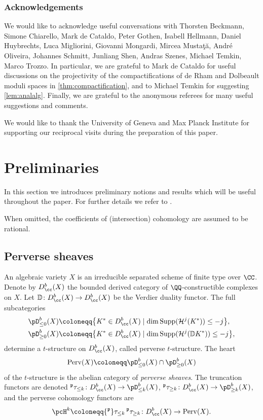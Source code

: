 \subsubsection*{Acknowledgements}
We would like to acknowledge useful conversations with Thorsten Beckmann, Simone Chiarello, Mark de Cataldo, Peter Gothen, Isabell Hellmann, Daniel Huybrechts, Luca Migliorini, Giovanni Mongardi, Mircea Mustaţă, André Oliveira, Johannes Schmitt, Junliang Shen, Andras Szenes, Michael Temkin, Marco Trozzo. In particular, we are grateful to Mark de Cataldo for useful discussions on the projectivity of the compactifications of de Rham and Dolbeault moduli spaces in \cref{thm:compactification}, and to Michael Temkin for suggesting \cref{lem:analalg}.
Finally, we are grateful to the anonymous referees for many useful suggestions and comments.

We would like to thank the University of Geneva and Max Planck Institute for supporting our reciprocal visits during the preparation of this paper.


\section{Preliminaries}\label{sec:preliminaries}
In this section we introduces preliminary notions and results which will be useful throughout the paper. For further details we refer to
\cite{BeilinsonBernsteinDeligne1981, GM80, GM81, deCataldoMigliorini05}.

When omitted, the coefficients of (intersection) cohomology are assumed to be rational.

\subsection{Perverse sheaves}
An algebraic variety $X$ is an irreducible separated scheme of finite type over $\CC$. Denote by $D^b_{\cc}(X)$ the bounded derived category of $\QQ$-construc\-tible complexes on $X$. Let $\mathbb{D}\colon D^b_{\cc}(X)\to D^b_{\cc}(X)$ be the Verdier duality functor.
The full subcategories
\begin{align*}
\pD^b_{\leq 0}(X) &\coloneqq \bigl \lbrace K^*\in D^b_{\cc}(X) \mid \dim \mathrm{Supp}(\mathcal{H}^j(K^*))\leq -j \bigr \rbrace,\\
\pD^b_{\geq 0}(X) &\coloneqq\bigl \lbrace K^* \in D^b_{\cc}(X) \mid \dim \mathrm{Supp}(\mathcal{H}^j(\mathbb{D}K^*))\leq -j \bigr \rbrace,
\end{align*}
determine a $t$-structure on $D^b_{\cc}(X)$, called perverse $t$-structure. The heart
\[
\mathrm{Perv}(X) \coloneqq \pD^b_{\leq 0}(X)\cap \pD^b_{\geq 0}(X)
\]
of the $t$-structure is the abelian category of \emph{perverse sheaves}. The truncation functors are denoted ${^{\mathfrak{p}}}\tau_{\leq k}\colon D^b_{\cc}(X)\to \pD^b_{\leq k}(X)$, ${^{\mathfrak{p}}}\tau_{\geq k}\colon D^b_{\cc}(X)\to \pD^b_{\geq k}(X)$, and the perverse cohomology functors are
\[
\pcH^{k} \coloneqq {^{\mathfrak{p}}}\tau_{\leq k}\,{^{\mathfrak{p}}}\tau_{\geq k}\colon D^b_{\cc}(X) \to \mathrm{Perv}(X).
\]


